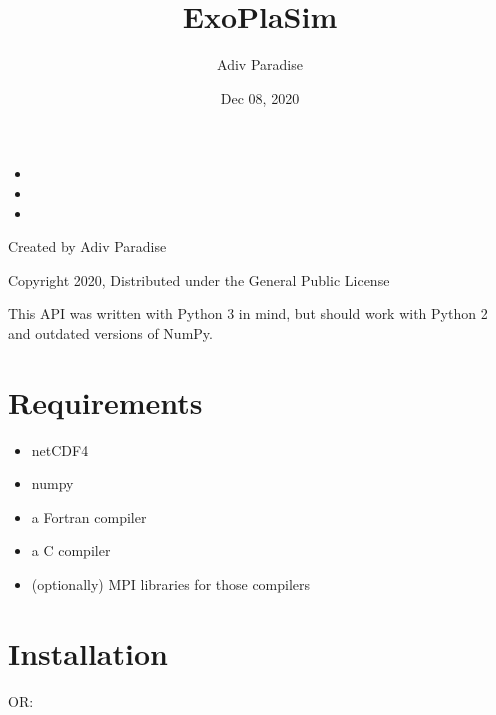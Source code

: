 \documentclass[letterpaper,10pt,english]{sphinxmanual}
\title{ExoPlaSim}
\date{Dec 08, 2020}
\author{Adiv Paradise}
\begin{document}
\pagestyle{empty}
\sphinxmaketitle
\pagestyle{plain}
\sphinxtableofcontents
\pagestyle{normal}
\label{\detokenize{index::doc}}

\begin{itemize}
\item {} 

\item {} 

\item {} 

\end{itemize}

Created by Adiv Paradise

Copyright 2020, Distributed under the General Public License

This API was written with Python 3 in mind, but should work with
Python 2 and outdated versions of NumPy.


\chapter{Requirements}
\label{\detokenize{index:requirements}}\begin{itemize}
\item {} 
netCDF4

\item {} 
numpy

\item {} 
a Fortran compiler

\item {} 
a C compiler

\item {} 
(optionally) MPI libraries for those compilers

\end{itemize}


\chapter{Installation}
\label{\detokenize{index:installation}}
\begin{sphinxVerbatim}[commandchars=\\\{\}]
  
\end{sphinxVerbatim}

OR:

\begin{sphinxVerbatim}[commandchars=\\\{\}]
  
\end{sphinxVerbatim}
\end{document}
